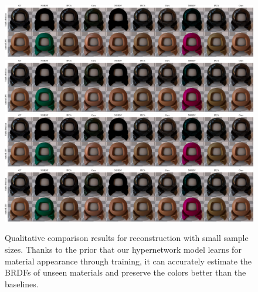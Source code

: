 \begin{figure}[t]
%
  {\includegraphics[width=0.9\linewidth]{Chapters/hyperbrdf-figs/imp_comp_upt_3vals_bad.pdf}}
%
  {\includegraphics[width=0.9\linewidth]{Chapters/hyperbrdf-figs/imp_comp_upt_3vals_bad.pdf}}
%
  {\includegraphics[width=0.9\linewidth]{Chapters/hyperbrdf-figs/imp_comp_upt_3vals_bad.pdf}}
%
  {\includegraphics[width=0.9\linewidth]{Chapters/hyperbrdf-figs/imp_comp_upt_3vals_bad.pdf}}
\\
   \caption{Qualitative comparison results for reconstruction with small sample sizes. Thanks to the prior that our hypernetwork model learns for material appearance through training, it can accurately estimate the BRDFs of unseen materials and preserve the colors better than the baselines.}  

   \label{fig:imp_comp_upt}
\end{figure}


